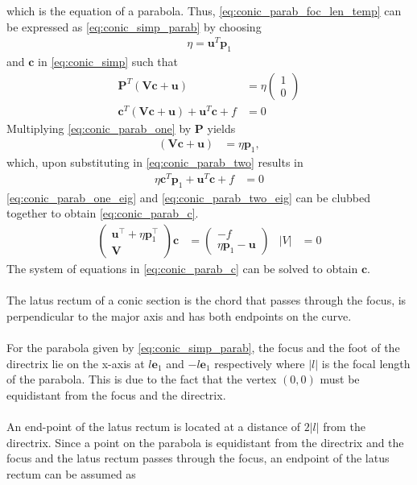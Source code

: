 \documentclass[journal,10pt,twocolumn]{article}
\providecommand{\abs}[1]{\left\vert#1\right\vert}
\let\vec\mathbf
\newcommand{\myvec}[1]{\ensuremath{\begin{pmatrix}#1\end{pmatrix}}}
\providecommand{\brak}[1]{\ensuremath{\left(#1\right)}}
\begin{document}
which is the equation of a parabola. 
Thus, \eqref{eq:conic_parab_foc_len_temp} 
can be expressed as \eqref{eq:conic_simp_parab} by choosing
\begin{align}
\eta = \vec{u}^T\vec{p}_1
\end{align}
and $\vec{c}$ in \eqref{eq:conic_simp} such that
\begin{align}
\label{eq:conic_parab_one}
\vec{P}^{T}\brak{\vec{V}\vec{c}+\vec{u}} &= \eta\myvec{1\\0}
\\
\vec{c}^T\brak{\vec{V}\vec{c} + \vec{u}}+ \vec{u}^T\vec{c} + f&= 0
\label{eq:conic_parab_two}
\end{align}
Multiplying \eqref{eq:conic_parab_one} by $\vec{P}$ yields
\begin{align}
\label{eq:conic_parab_one_eig}
\brak{\vec{V}\vec{c}+\vec{u}} &= \eta\vec{p}_1,
\end{align}
which, upon substituting in \eqref{eq:conic_parab_two}
results in 
\begin{align}
\eta\vec{c}^T\vec{p}_1 + \vec{u}^T\vec{c} + f&= 0
\label{eq:conic_parab_two_eig}
\end{align}
\eqref{eq:conic_parab_one_eig} and \eqref{eq:conic_parab_two_eig} can be clubbed together to obtain \eqref{eq:conic_parab_c}.
\begin{align}
    \myvec{ \vec{u}^{\top}+\eta\vec{p}_1^{\top} \\ \vec{V}}\vec{c} &= \myvec{-f \\ \eta\vec{p}_1-\vec{u}}  &\abs{V} &= 0
    \label{eq:conic_parab_c}
    \end{align}
The system of equations in \eqref{eq:conic_parab_c} can be solved to obtain $\vec{c}$.\\\\
The latus rectum of a conic section is the chord that passes through the focus, is perpendicular to the major axis and has both endpoints on the curve.\\\\For the parabola given by \eqref{eq:conic_simp_parab}, the focus and the foot of the directrix lie on the x-axis at  $l\vec{e}_1$ and $-l\vec{e}_1$ respectively where $\abs{l}$ is the focal length of the parabola. This is due to the fact that the vertex $(0,0)$ must be equidistant from the focus and the directrix.\\\\An end-point of the latus rectum is located at a distance of $2\abs{l}$ from the directrix. Since a point on the parabola is equidistant from the directrix and the focus and the latus rectum passes through the focus, an endpoint of the latus rectum can be assumed as
\end{document}
